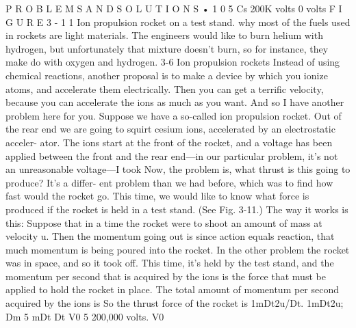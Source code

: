 \documentclass[10pt,oneside]{article}
\begin{document}
P R O B L E M S  A N D  S O L U T I O N S • 1 0 5 Cs 200K volts 0 volts F I G U R E  3 - 1 1 Ion propulsion rocket on a test stand. why most of the fuels used in rockets are light materials. The engineers would like to burn helium with hydrogen, but unfortunately that mixture doesn’t burn, so for instance, they make do with oxygen and hydrogen. 3-6 Ion propulsion rockets Instead of using chemical reactions, another proposal is to make a device by which you ionize atoms, and accelerate them electrically. Then you can get a terrific velocity, because you can accelerate the ions as much as you want. And so I have another problem here for you. Suppose we have a so-called ion propulsion rocket. Out of the rear end we are going to squirt cesium ions, accelerated by an electrostatic acceler- ator. The ions start at the front of the rocket, and a voltage has been applied between the front and the rear end---in our particular problem, it’s not an unreasonable voltage---I took Now, the problem is, what thrust is this going to produce? It’s a differ- ent problem than we had before, which was to find how fast would the rocket go. This time, we would like to know what force is produced if the rocket is held in a test stand. (See Fig. 3-11.) The way it works is this: Suppose that in a time the rocket were to shoot an amount of mass at velocity u. Then the momentum going out is since action equals reaction, that much momentum is being poured into the rocket. In the other problem the rocket was in space, and so it took off. This time, it’s held by the test stand, and the momentum per second that is acquired by the ions is the force that must be applied to hold the rocket in place. The total amount of momentum per second acquired by the ions is So the thrust force of the rocket is 1mDt2u/Dt. 1mDt2u; Dm 5 mDt Dt V0 5 200,000 volts. V0\par
\end{document}
